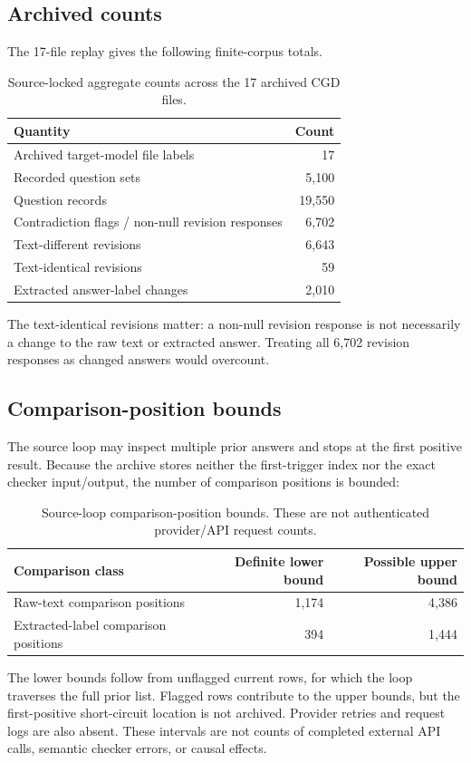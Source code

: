 \documentclass[11pt]{article}
\begin{document}
\subsection{Archived counts}
The 17-file replay gives the following finite-corpus totals.
\begin{table}[h]
\centering
\begin{tabular}{lr}
\toprule
Quantity & Count \\
\midrule
Archived target-model file labels & 17 \\
Recorded question sets & 5,100 \\
Question records & 19,550 \\
Contradiction flags / non-null revision responses & 6,702 \\
Text-different revisions & 6,643 \\
Text-identical revisions & 59 \\
Extracted answer-label changes & 2,010 \\
\bottomrule
\end{tabular}
\caption{Source-locked aggregate counts across the 17 archived CGD files.}
\label{tab:counts}
\end{table}

The text-identical revisions matter: a non-null revision response is not necessarily a change to the raw text or extracted answer. Treating all 6,702 revision responses as changed answers would overcount.

\subsection{Comparison-position bounds}
The source loop may inspect multiple prior answers and stops at the first positive result. Because the archive stores neither the first-trigger index nor the exact checker input/output, the number of comparison positions is bounded:
\begin{table}[h]
\centering
\begin{tabular}{lrr}
\toprule
Comparison class & Definite lower bound & Possible upper bound \\
\midrule
Raw-text comparison positions & 1,174 & 4,386 \\
Extracted-label comparison positions & 394 & 1,444 \\
\bottomrule
\end{tabular}
\caption{Source-loop comparison-position bounds. These are not authenticated provider/API request counts.}
\label{tab:bounds}
\end{table}
The lower bounds follow from unflagged current rows, for which the loop traverses the full prior list. Flagged rows contribute to the upper bounds, but the first-positive short-circuit location is not archived. Provider retries and request logs are also absent. These intervals are not counts of completed external API calls, semantic checker errors, or causal effects.
\end{document}

